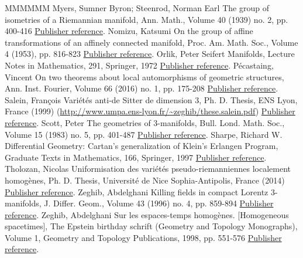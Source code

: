 \begin{thebibliography}{MMMMMM}
 Myers, Sumner Byron; Steenrod, Norman Earl The group of isometries of a Riemannian manifold, Ann. Math., Volume 40 (1939) no. 2, pp. 400-416 \href{https://ahl.centre-mersenne.org/item/AHL_2020__3__407_0/#myers-steenrod}{Publisher reference}.
 Nomizu, Katsumi On the group of affine transformations of an affinely connected manifold, Proc. Am. Math. Soc., Volume 4 (1953), pp. 816-823 \href{https://ahl.centre-mersenne.org/item/AHL_2020__3__407_0/#nomizu2}{Publisher reference}.
 Orlik, Peter Seifert Manifolds, Lecture Notes in Mathematics, 291, Springer, 1972 \href{https://ahl.centre-mersenne.org/item/AHL_2020__3__407_0/#orlik}{Publisher reference}.
 Pécastaing, Vincent On two theorems about local automorphisms of geometric structures, Ann. Inst. Fourier, Volume 66 (2016) no. 1, pp. 175-208 \href{https://ahl.centre-mersenne.org/item/AHL_2020__3__407_0/#vincent}{Publisher reference}.
 Salein, François Variétés anti-de Sitter de dimension 3, Ph. D. Thesis, ENS Lyon, France (1999) (\url{http://www.umpa.ens-lyon.fr/~zeghib/these.salein.pdf}) \href{https://ahl.centre-mersenne.org/item/AHL_2020__3__407_0/#saleinthese}{Publisher reference}.
 Scott, Peter The geometries of 3-manifolds, Bull. Lond. Math. Soc., Volume 15 (1983) no. 5, pp. 401-487 \href{https://ahl.centre-mersenne.org/item/AHL_2020__3__407_0/#scott}{Publisher reference}.
 Sharpe, Richard W. Differential Geometry: Cartan’s generalization of Klein’s Erlangen Program, Graduate Texts in Mathematics, 166, Springer, 1997 \href{https://ahl.centre-mersenne.org/item/AHL_2020__3__407_0/#sharpe}{Publisher reference}.
 Tholozan, Nicolas Uniformisation des variétés pseudo-riemanniennes localement homogènes, Ph. D. Thesis, Université de Nice Sophia-Antipolis, France (2014) \href{https://ahl.centre-mersenne.org/item/AHL_2020__3__407_0/#tholozan}{Publisher reference}.
 Zeghib, Abdelghani Killing fields in compact Lorentz 3-manifolds, J. Differ. Geom., Volume 43 (1996) no. 4, pp. 859-894 \href{https://ahl.centre-mersenne.org/item/AHL_2020__3__407_0/#zeghibflot}{Publisher reference}.
 Zeghib, Abdelghani Sur les espaces-temps homogènes. [Homogeneous spacetimes], The Epstein birthday schrift (Geometry and Topology Monographs), Volume 1, Geometry and Topology Publications, 1998, pp. 551-576 \href{https://ahl.centre-mersenne.org/item/AHL_2020__3__407_0/#zeghib.isom}{Publisher reference}.

\end{thebibliography}
